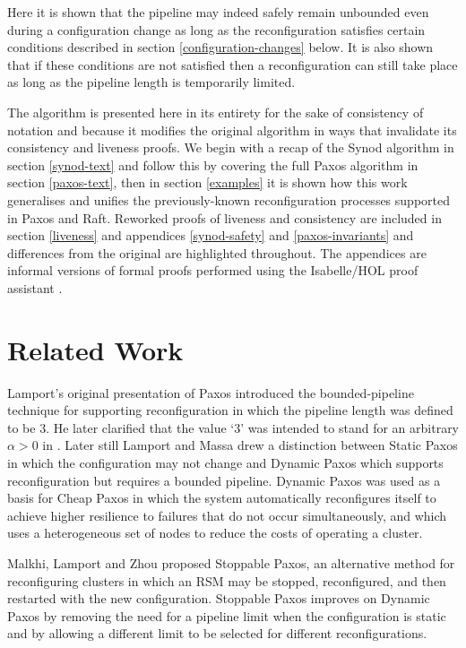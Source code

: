 \documentclass[journal]{IEEEtran}
\begin{document}
Here it is shown that the pipeline may indeed safely remain unbounded even
during a configuration change as long as the reconfiguration satisfies certain
conditions described in section \ref{configuration-changes} below. It is also
shown that if these conditions are not satisfied then a reconfiguration can
still take place as long as the pipeline length is temporarily limited.

The algorithm is presented here in its entirety for the sake of consistency of
notation and because it modifies the original algorithm in ways that invalidate
its consistency and liveness proofs.  We begin with a recap of the Synod
algorithm in section \ref{synod-text} and follow this by covering the full
Paxos algorithm in section \ref{paxos-text}, then in section
\ref{examples} it is shown how this work generalises and
unifies the previously-known reconfiguration processes supported in Paxos and
Raft. Reworked proofs of liveness and consistency are included in section
\ref{liveness} and appendices \ref{synod-safety} and \ref{paxos-invariants} and
differences from the original are highlighted throughout. The appendices are
informal versions of formal proofs performed using the Isabelle/HOL proof
assistant \cite{isabelle-hol}.


\section{Related Work}

Lamport's original presentation of Paxos \cite{part-time-parliament} introduced
the bounded-pipeline technique for supporting reconfiguration in which the
pipeline length was defined to be 3. He later clarified that the value `3' was
intended to stand for an arbitrary $\alpha > 0$ in \cite{paxos-made-simple}.
Later still Lamport and Massa \cite{cheap-paxos} drew a distinction between
Static Paxos in which the configuration may not change and Dynamic Paxos which
supports reconfiguration but requires a bounded pipeline.  Dynamic Paxos was
used as a basis for Cheap Paxos in which the system automatically reconfigures
itself to achieve higher resilience to failures that do not occur
simultaneously, and which uses a heterogeneous set of nodes to reduce the costs
of operating a cluster.

Malkhi, Lamport and Zhou \cite{stoppable-paxos} proposed Stoppable Paxos, an
alternative method for reconfiguring clusters in which an RSM may be stopped,
reconfigured, and then restarted with the new configuration. Stoppable Paxos
improves on Dynamic Paxos by removing the need for a pipeline limit when the
configuration is static and by allowing a different limit to be selected for
different reconfigurations.
\end{document}
